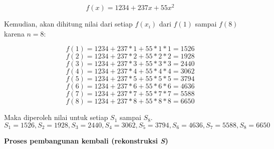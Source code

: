 \begin{displaymath}
	f(x) = 1234 + 237x + 55x^2
\end{displaymath}

Kemudian, akan dihitung nilai dari setiap \begin{math}f(x_i)\end{math} dari \begin{math}f(1)\end{math} sampai \begin{math}f(8)\end{math} karena \begin{math}n=8\end{math}:

\begin{displaymath}
	f(1) = 1234 + 237*1 + 55*1*1 = 1526
\end{displaymath}
\begin{displaymath}
	f(2) = 1234 + 237*2 + 55*2*2 = 1928
\end{displaymath}
\begin{displaymath}
	f(3) = 1234 + 237*3 + 55*3*3 = 2440
\end{displaymath}
\begin{displaymath}
	f(4) = 1234 + 237*4 + 55*4*4 = 3062
\end{displaymath}
\begin{displaymath}
	f(5) = 1234 + 237*5 + 55*5*5 = 3794
\end{displaymath}
\begin{displaymath}
	f(6) = 1234 + 237*6 + 55*6*6 = 4636
\end{displaymath}
\begin{displaymath}
	f(7) = 1234 + 237*7 + 55*7*7 = 5588
\end{displaymath}
\begin{displaymath}
	f(8) = 1234 + 237*8 + 55*8*8 = 6650
\end{displaymath}

Maka diperoleh nilai untuk setiap \begin{math}S_1\end{math} sampai \begin{math}S_8\end{math}.
\begin{displaymath}
	S_1 = 1526, S_2 = 1928, S_3 = 2440, S_4 = 3062, S_5 = 3794, S_6 = 4636, S_7 = 5588, S_8 = 6650
\end{displaymath}

\begin{flushleft}
	\textbf{Proses pembangunan kembali (rekonstruksi \textit{S})}
\end{flushleft}

